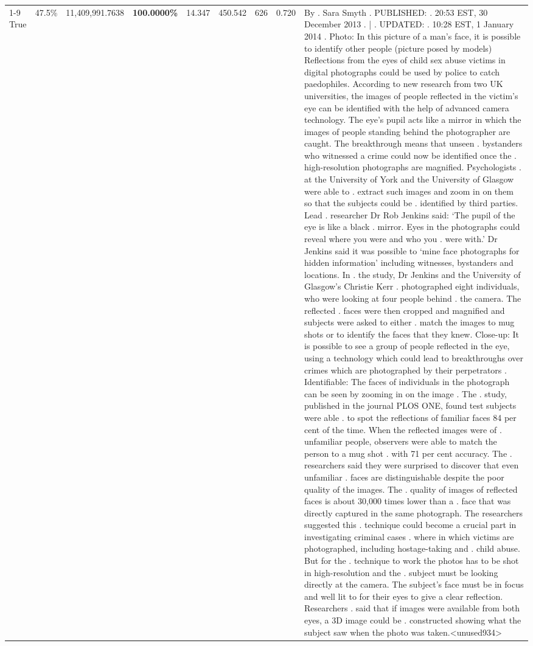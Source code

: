\begin{table}[H]
\begin{tabular}{lllrlllll}
\cline{1-9}
True & 47.5\% & 11,409,991.7638 & \bfseries \color{red} 100.0000\% & 14.347 & 450.542 & 626 & 0.720 & By . Sara Smyth . PUBLISHED: . 20:53 EST, 30 December 2013 . | . UPDATED: . 10:28 EST, 1 January 2014 . Photo: In this picture of a man's face, it is possible to identify other people (picture posed by models) Reflections from the eyes of child sex abuse victims in digital photographs could be used by police to catch paedophiles. According to new research from two UK universities, the images of people reflected in the victim's eye can be identified with the help of advanced camera technology. The eye's pupil acts like a mirror in which the images of people standing behind the photographer are caught. The breakthrough means that unseen . bystanders who witnessed a crime could now be identified once the . high-resolution photographs are magnified. Psychologists . at the University of York and the University of Glasgow were able to . extract such images and zoom in on them so that the subjects could be . identified by third parties. Lead . researcher Dr Rob Jenkins said: ‘The pupil of the eye is like a black . mirror. Eyes in the photographs could reveal where you were and who you . were with.' Dr Jenkins said it was possible to ‘mine face photographs for hidden information' including witnesses, bystanders and locations. In . the study, Dr Jenkins and the University of Glasgow's Christie Kerr . photographed eight individuals, who were looking at four people behind . the camera. The reflected . faces were then cropped and magnified and subjects were asked to either . match the images to mug shots or to identify the faces that they knew. Close-up: It is possible to see a group of people reflected in the eye, using a technology which could lead to breakthroughs over crimes which are photographed by their perpetrators . Identifiable: The faces of individuals in the photograph can be seen by zooming in on the image . The . study, published in the journal PLOS ONE, found test subjects were able . to spot the reflections of familiar faces 84 per cent of the time. When the reflected images were of . unfamiliar people, observers were able to match the person to a mug shot . with 71 per cent accuracy. The . researchers said they were surprised to discover that even unfamiliar . faces are distinguishable despite the poor quality of the images. The . quality of images of reflected faces is about 30,000 times lower than a . face that was directly captured in the same photograph. The researchers suggested this . technique could become a crucial part in investigating criminal cases . where in which victims are photographed, including hostage-taking and . child abuse. But for the . technique to work the photos has to be shot in high-resolution and the . subject must be looking directly at the camera. The subject's face must be in focus and well lit to for their eyes to give a clear reflection. Researchers . said that if images were available from both eyes, a 3D image could be . constructed showing what the subject saw when the photo was taken.<unused934> \\

\end{tabular}
\end{table}
